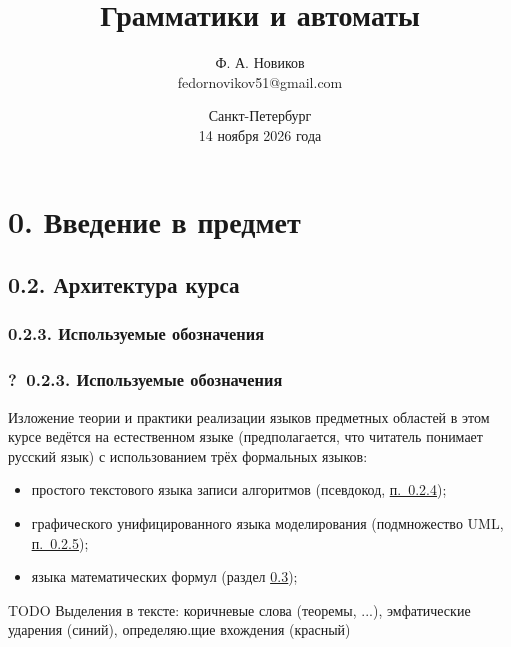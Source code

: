 \documentclass[mathserif,12pt,aspectratio=169]{beamer}
\def\DMref#1#2{{\color{blue}\underline{\hyperlink{#2}{#1}}}}
\def\TODO#1{{\color{gray} TODO {#1}}}
\def\Qm{{\color{brown}\textbf{?}\ }}
\begin{document}
	\title{Грамматики и автоматы}  
	\author{Ф. А. Новиков\\fedornovikov51@gmail.com}
	
	
	
	\date{Санкт-Петербург\\14 ноября 2026 года} 
	\frame{\titlepage} 
\section{0. Введение в предмет}

\subsection{0.2. Архитектура курса}\label{0.2.}

\subsubsection{0.2.3. Используемые обозначения}\label{0.2.3.}
\begin{frame}
\frametitle{\Qm 0.2.3. Используемые обозначения}
Изложение теории и практики реализации 
языков предметных областей в этом курсе
ведётся на естественном языке 
(предполагается, что читатель понимает русский язык)
с использованием трёх формальных языков:
\begin{itemize}
\item простого текстового языка записи алгоритмов (псевдокод, \DMref{п.~0.2.4}{0.2.4.});
\item графического унифицированного языка моделирования
(подмножество UML, \DMref{п.~0.2.5}{0.2.5.});
\item языка математических формул (раздел \DMref{0.3}{0.3.});
\end{itemize}  


\TODO{ Выделения в тексте: коричневые слова (теоремы, ...), 
эмфатические ударения (синий), определяю.щие вхождения (красный)}


\end{frame}
\end{document}
